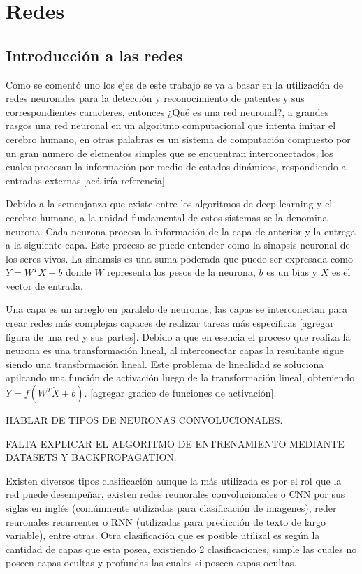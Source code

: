 \section{Redes}

\subsection{Introducción a las redes}

Como se comentó uno los ejes de este trabajo se va a basar en la utilización de redes neuronales para la detección y reconocimiento de patentes y sus correspondientes caracteres, entonces ¿Qué es una red neuronal?, a grandes rasgos una red neuronal en un algoritmo computacional que intenta imitar el cerebro humano, en otras palabras es un sistema de computación compuesto por un gran numero de elementos simples que se encuentran interconectados, los cuales procesan la información por medio de estados dinámicos, respondiendo a entradas externas.[acá iría referencia]

Debido a la semenjanza que existe entre los algoritmos de deep learning y el cerebro humano, a la unidad fundamental de estos sistemas se la denomina neurona.
Cada neurona procesa la información de la capa de anterior y la entrega a la siguiente capa. Este proceso se puede entender como la sinapsis neuronal de los seres vivos.
La sinamsis es una suma poderada que puede ser expresada como $Y = W^T\dot X + b$ donde $W$ representa los pesos de la neurona, $b$ es un bias y $X$ es el vector de entrada.

Una capa es un arreglo en paralelo de neuronas, las capas se interconectan para crear redes más complejas capaces de realizar tareas más especificas [agregar figura de una red y sus partes].
Debido a que en esencia el proceso que realiza la neurona es una transformación lineal, al interconectar capas la resultante sigue siendo una transformación lineal. Este problema de linealidad se soluciona apilcando una función de activación luego de la transformación lineal, obteniendo $Y=f(W^T \dot X + b)$. [agregar grafico de funciones de activación].

HABLAR DE TIPOS DE NEURONAS CONVOLUCIONALES.

FALTA EXPLICAR EL ALGORITMO DE ENTRENAMIENTO MEDIANTE DATASETS Y BACKPROPAGATION.

Existen diversos tipos clasificación aunque la más utilizada es por el rol que la red puede desempeñar, existen redes reunorales convolucionales o CNN por sus siglas en inglés (comúnmente utilizadas para clasificación de imagenes),
reder reuronales recurrenter o RNN (utilizadas para predicción de texto de largo variable), entre otras. Otra clasificación que es posible utilizal es según la cantidad de capas que esta posea, existiendo 2 clasificaciones, simple las cuales no poseen capas ocultas y profundas las cuales si poseen capas ocultas.


